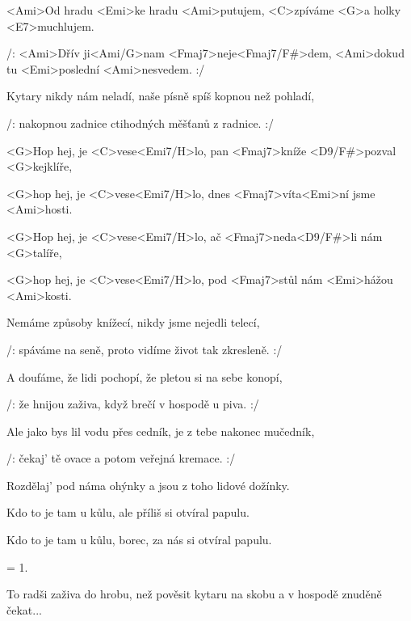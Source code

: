

\zs
<Ami>Od hradu <Emi>ke hradu <Ami>putujem,
<C>zpíváme <G>a holky <E7>muchlujem.

/: <Ami>Dřív ji<Ami/G>nam <Fmaj7>neje<Fmaj7/F#>dem,
<Ami>dokud tu <Emi>poslední <Ami>nesvedem. :/
\ks

\zs
Kytary nikdy nám neladí,
naše písně spíš kopnou než pohladí,

/: nakopnou zadnice
ctihodných měšťanů z radnice. :/
\ks

\zr
<G>Hop hej, je <C>vese<Emi7/H>lo,
pan <Fmaj7>kníže <D9/F#>pozval <G>kejklíře,

<G>hop hej, je <C>vese<Emi7/H>lo,
dnes <Fmaj7>víta<Emi>ní jsme <Ami>hosti.

<G>Hop hej, je <C>vese<Emi7/H>lo,
ač <Fmaj7>neda<D9/F#>li nám <G>talíře,

<G>hop hej, je <C>vese<Emi7/H>lo,
pod <Fmaj7>stůl nám <Emi>hážou <Ami>kosti.
\kr

\zs
Nemáme způsoby knížecí,
nikdy jsme nejedli telecí,

/: spáváme na seně,
proto vidíme život tak zkresleně. :/
\ks

\zs
A doufáme, že lidi pochopí,
že pletou si na sebe konopí,

/: že hnijou zaživa,
když brečí v hospodě u piva. :/
\ks

\zr \kr

\zs
Ale jako bys lil vodu přes cedník,
je z tebe nakonec mučedník,

/: čekaj' tě ovace
a potom veřejná kremace. :/
\ks

\zs
Rozdělaj' pod náma ohýnky
a jsou z toho lidové dožínky.

Kdo to je tam u kůlu,
ale příliš si otvíral papulu.

Kdo to je tam u kůlu,
borec, za nás si otvíral papulu.
\ks

\zr \kr

\zs
= 1.
\ks

\zs
To radši zaživa do hrobu,
než pověsit kytaru na skobu
a v hospodě znuděně čekat...
\ks

\kp

